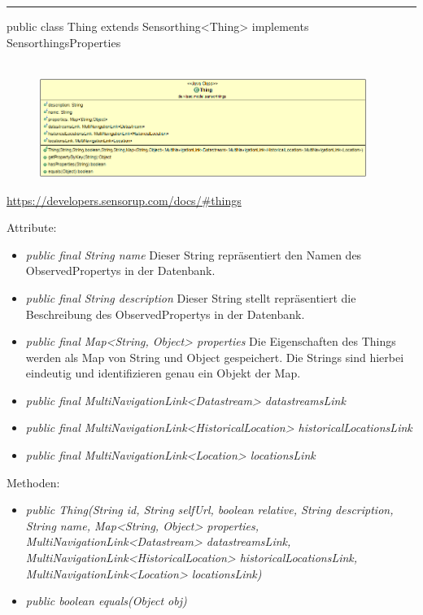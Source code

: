 \rule{\textwidth}{0.4pt}
public class Thing extends Sensorthing<Thing> implements SensorthingsProperties
\\\\
\begin{minipage}{0.4\textwidth}
    \begin{figure}[H]
        {\centering\includegraphics[width=0.95\textwidth]{media/backend/modell/classes/Thing.png}}
    \end{figure}
    \end{minipage} \hfill
\begin{minipage}{0.6\textwidth}
    \url{https://developers.sensorup.com/docs/#things}
\end{minipage}

Attribute:
\begin{itemize}
    \item \emph{public final String name} Dieser String repräsentiert den Namen des ObservedPropertys in der Datenbank.
    \item \emph{public final String description} Dieser String stellt repräsentiert die Beschreibung des ObservedPropertys in der Datenbank.
    \item \emph{public final Map<String, Object> properties} Die Eigenschaften des Things werden als Map von String und Object gespeichert. Die Strings sind hierbei eindeutig und identifizieren genau ein Objekt der Map.
    \item \emph{public final MultiNavigationLink<Datastream> datastreamsLink} 
    \item \emph{public final MultiNavigationLink<HistoricalLocation> historicalLocationsLink} 
    \item \emph{public final MultiNavigationLink<Location> locationsLink} 
\end{itemize}
Methoden:
\begin{itemize}
    \item \emph{public Thing(String id, String selfUrl, boolean relative, String description, String name, Map<String, Object> properties, MultiNavigationLink<Datastream> datastreamsLink, MultiNavigationLink<HistoricalLocation> historicalLocationsLink, MultiNavigationLink<Location> locationsLink)}
    \item \emph{public boolean equals(Object obj)} 
\end{itemize}

